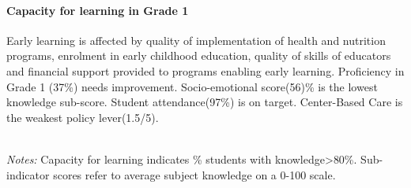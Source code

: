 \documentclass[
  twocolumn]{article}
\begin{document}
\hypertarget{capacity-for-learning-in-grade-1}{%
\paragraph{\texorpdfstring{\textbf{Capacity for learning in Grade
1}}{Capacity for learning in Grade 1}}\label{capacity-for-learning-in-grade-1}}

Early learning is affected by quality of implementation of health and
nutrition programs, enrolment in early childhood education, quality of
skills of educators and financial support provided to programs enabling
early learning. Proficiency in Grade 1 (37\%) needs improvement.
Socio-emotional score(56)\% is the lowest knowledge sub-score. Student
attendance(97\%) is on target. Center-Based Care is the weakest policy
lever(1.5/5).

\begin{table}[H]
\\
\color{darkgray}\scriptsize{\textit{Notes:} Capacity for learning indicates \% students with knowledge\textgreater{80\%}. Sub-indicator scores refer to average subject knowledge on a 0-100 scale.}
\end{table}
\raggedbottom
\end{document}
